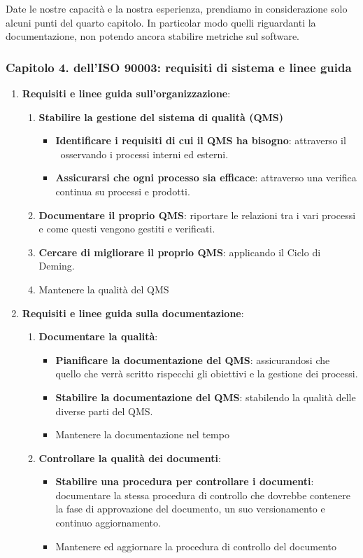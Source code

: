 	Date le nostre capacità e la nostra esperienza, prendiamo in considerazione solo alcuni punti del quarto capitolo. In particolar modo quelli riguardanti la documentazione, non potendo ancora stabilire metriche sul software.
	
	\subsubsection{Capitolo 4. dell'ISO 90003: requisiti di sistema e linee guida}
	
	\begin{enumerate}
		\item \textbf{Requisiti e linee guida sull'organizzazione}:
		\begin{enumerate}
			\item \textbf{Stabilire la gestione del sistema di qualità (QMS)}
			\begin{itemize}
				\item \textbf{Identificare i requisiti di cui il QMS ha bisogno}: attraverso il \PdQ~osservando i processi interni ed esterni.
				\item \textbf{Assicurarsi che ogni processo sia efficace}: attraverso una verifica continua su processi e prodotti.
			\end{itemize}
			\item \textbf{Documentare il proprio QMS}: riportare le relazioni tra i vari processi e come questi vengono gestiti e verificati.
			\item \textbf{Cercare di migliorare il proprio QMS}: applicando il Ciclo di Deming.
			\item Mantenere la qualità del QMS
		\end{enumerate} 
		\newpage
		\item \textbf{Requisiti e linee guida sulla documentazione}:
		\begin{enumerate}
			\item \textbf{Documentare la qualità}:
			\begin{itemize}
				\item \textbf{Pianificare la documentazione del QMS}: assicurandosi che quello che verrà scritto rispecchi gli obiettivi e la gestione dei processi.
				\item \textbf{Stabilire la documentazione del QMS}: stabilendo la qualità delle diverse parti del QMS.
				\item Mantenere la documentazione nel tempo
			\end{itemize}
			
			\item \textbf{Controllare la qualità dei documenti}:
			\begin{itemize}
				\item \textbf{Stabilire una procedura per controllare i documenti}: documentare la stessa procedura di controllo che dovrebbe contenere la fase di approvazione del documento, un suo versionamento e continuo aggiornamento.
				\item Mantenere ed aggiornare la procedura di controllo del documento
			\end{itemize}
		\end{enumerate}
	\end{enumerate}
